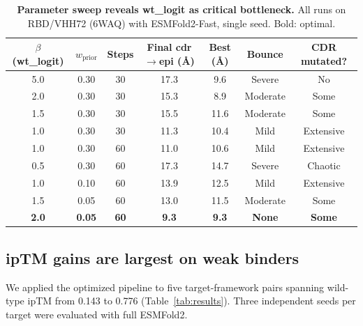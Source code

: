 \documentclass[11pt,a4paper]{article}
\begin{document}
\begin{table}[H]
\centering
\caption{\textbf{Parameter sweep reveals wt\_logit as critical bottleneck.} All runs on RBD/VHH72 (6WAQ) with ESMFold2-Fast, single seed. Bold: optimal.}
\label{tab:sweep}
\begin{tabular}{@{}ccccccc@{}}
\toprule
$\beta$ (wt\_logit) & $w_\text{prior}$ & Steps & Final cdr$\to$epi (\AA) & Best (\AA) & Bounce & CDR mutated? \\
\midrule
5.0 & 0.30 & 30 & 17.3 & 9.6  & Severe  & No \\
2.0 & 0.30 & 30 & 15.3 & 8.9  & Moderate & Some \\
1.5 & 0.30 & 30 & 15.5 & 11.6 & Moderate & Some \\
1.0 & 0.30 & 30 & 11.3 & 10.4 & Mild    & Extensive \\
1.0 & 0.30 & 60 & 11.0 & 10.6 & Mild    & Extensive \\
0.5 & 0.30 & 60 & 17.3 & 14.7 & Severe  & Chaotic \\
1.0 & 0.10 & 60 & 13.9 & 12.5 & Mild    & Extensive \\
1.5 & 0.05 & 60 & 13.0 & 11.5 & Moderate & Some \\
\textbf{2.0} & \textbf{0.05} & \textbf{60} & \textbf{9.3} & \textbf{9.3} & \textbf{None} & \textbf{Some} \\
\bottomrule
\end{tabular}
\end{table}

\subsection{ipTM gains are largest on weak binders}

We applied the optimized pipeline to five target-framework pairs spanning wild-type ipTM from \num{0.143} to \num{0.776} (Table~\ref{tab:results}). Three independent seeds per target were evaluated with full ESMFold2.
\end{document}
